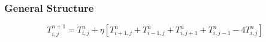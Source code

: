 \begin{frame}
\frametitle{General Structure}
$$
	T_{i,j}^{n+1} = 
				T_{i,j}^n
				+ \eta
					\left[ T_{i+1,j}^n + T_{i-1,j}^n 
						 + T_{i,j+1}^n + T_{i,j-1}^n
						 - 4 T_{i,j}^n
					\right]
$$

\end{frame}